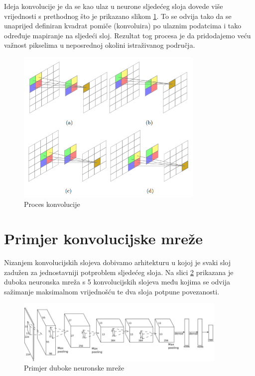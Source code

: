 \documentclass[lmodern, utf8, seminar]{fer}
\begin{document}
Ideja konvolucije je da se kao ulaz u neurone sljedećeg sloja dovede više vrijednosti s prethodnog što je prikazano slikom \ref{fig:convolution}. To se odvija tako da se unaprijed definiran kvadrat pomiče (konvoluira) po ulaznim podatcima i tako određuje mapiranje na sljedeći sloj. Rezultat tog procesa je da pridodajemo veću važnost pikselima u neposrednoj okolini istraživanog područja.
\newline

\begin{figure}[H]
    \centering
    \includegraphics[width=0.8\textwidth]{convolution}
    \caption{Proces konvolucije}
    \label{fig:convolution}
\end{figure}

\section{Primjer konvolucijske mreže}
Nizanjem konvolucijskih slojeva dobivamo arhitekturu u kojoj je svaki sloj zadužen za jednostavniji potproblem sljedećeg sloja. Na slici \ref{fig:dnn} prikazana je duboka neuronska mreža s 5 konvolucijskih slojeva među kojima se odvija sažimanje maksimalnom vrijednošću te dva sloja potpune povezanosti.
\newline

\begin{figure}[H]
    \centering
    \includegraphics[width=0.9\textwidth]{dnn}
    \caption{Primjer duboke neuronske mreže}
    \label{fig:dnn}
\end{figure}
\end{document}
